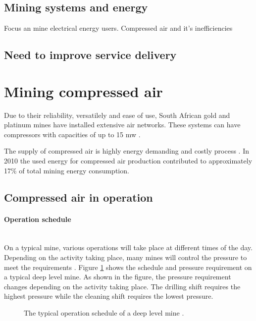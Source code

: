 \subsection{Mining systems and energy}
Focus an mine electrical energy users. Compressed air and it's inefficiencies
\subsection{Need to improve service delivery}
\section{Mining compressed air}
Due to their reliability, versatilely and ease of use, South African gold and platinum mines have installed extensive air networks. These systems can have compressors with capacities of up to 15 \gls{mw} \cite{Marais2012PhD}.\par
The supply of compressed air is highly energy demanding and costly process \cite{padachi2009energy}.  In 2010 the used energy for compressed air production contributed to approximately 17\% of total mining energy consumption.\cite{Eskom2010Energy}
\subsection{Compressed air in operation}
	\paragraph{Operation schedule}\leavevmode\\
	On a typical mine, various operations will take place at different times of the day. Depending on the activity taking place, many mines will control the pressure to meet the requirements \cite{Kriel2014Masters,Marais2012PhD}. Figure \ref{fig: Mining schedule} shows the schedule and pressure requirement on a typical deep level mine. As shown in the figure, the pressure requirement changes depending on the activity taking place. The drilling shift requires the highest pressure while the cleaning shift requires the lowest pressure.
		\begin{figure}[h]
		\centering
		\fbox{}
		\caption[A typical operation schedule of a deep level mine.]{The typical operation schedule of a deep level mine \cite{Kriel2014Masters}.}
		\label{fig: Mining schedule}
	\end{figure}
